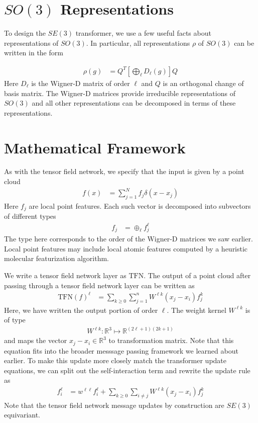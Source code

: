 \documentclass[book.tex]{subfiles}
\begin{document}
\section{$SO(3)$ Representations}

To design the $SE(3)$ transformer, we use a few useful facts about representations of $SO(3)$. In particular, all representations $\rho$ of $SO(3)$ can be written in the form

\begin{align}
\rho(g) &= Q^T \left [ \bigoplus_\ell D_\ell(g) \right ]Q
\end{align}
Here $D_\ell$ is the Wigner-D matrix of order $\ell$ and $Q$ is an orthogonal change of basis matrix. The Wigner-D matrices provide irreducible representations of $SO(3)$ and all other representations can be decomposed in terms of these representations.

\section{Mathematical Framework}

As with the tensor field network, we specify that the input is given by a point cloud
\begin{align}
f(x) &= \sum_{j=1}^N f_j \delta(x - x_j)
\end{align}
Here $f_j$ are local point features. Each such vector is decomposed into subvectors of different types
\begin{align}
f_j &= \oplus_\ell f^\ell_j
\end{align}
The type here corresponds to the order of the Wigner-D matrices we saw earlier. Local point features may include local atomic features computed by a heuristic molecular featurization algorithm.

We write a tensor field network layer as $\textrm{TFN}$. The output of a point cloud after passing through a tensor field network layer can be written as
\begin{align}
\textrm{TFN}(f)^\ell &= \sum_{k\geq 0} \sum_{j=1}^n W^{\ell k}(x_j - x_i) f^k_{j}
\end{align}
Here, we have written the output portion of order $\ell$. The weight kernel $W^{\ell k}$ is of type
\begin{align}
W^{\ell k}: \mathbb{R}^3 \mapsto \mathbb{R}^{(2\ell + 1) (2 k + 1)}
\end{align}
and maps the vector $x_j - x_i \in \mathbb{R}^3$ to transformation matrix. Note that this equation fits into the broader messsage passing framework we learned about earlier. To make this update more closely match the transformer update equations, we can split out the self-interaction term and rewrite the update rule as
\begin{align}
f^\ell_i &= w^{\ell \ell} f^\ell_i + \sum_{k \geq 0} \sum_{i \neq j} W^{\ell k}(x_j - x_i) f^k_j
\end{align}
Note that the tensor field network message updates by construction are $SE(3)$ equivariant.
\end{document}
